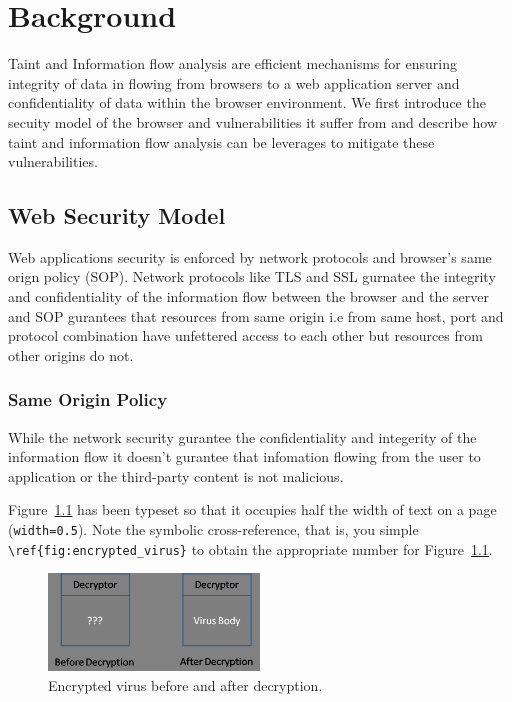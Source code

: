 \chapter{Background\label{chap:blah}}

Taint and Information flow analysis are efficient mechanisms for ensuring integrity of data in flowing from browsers to a web application server and confidentiality of data within the browser environment. We first 
introduce the secuity model of the browser and vulnerabilities it suffer from and describe how taint and information flow analysis can be leverages to mitigate these vulnerabilities.


\section{Web Security Model}

Web applications security is enforced by network protocols and browser's same orign policy (SOP). Network protocols like TLS and SSL gurnatee the integrity and confidentiality of the information flow between the browser and the server and SOP gurantees that resources from same origin i.e from same host, port and protocol combination have unfettered access to each other but resources from other origins do not.

\subsection{Same Origin Policy}
While the network security gurantee the confidentiality and integerity of the information flow it doesn't gurantee that infomation flowing from the user to application or the third-party content is not malicious.
 
Figure~\ref{fig:encrypted_virus} has been typeset so that it
occupies half the width of text on a page ({\tt width=0.5}). Note the 
symbolic cross-reference, that is, you simple \verb+\ref{fig:encrypted_virus}+
to obtain the appropriate number for Figure~\ref{fig:encrypted_virus}.

\begin{figure}[htb]
\centering
\includegraphics[width=0.5\textwidth]{images/encrypted_virus.jpg}
\caption{Encrypted virus before and after decryption.} 
\label{fig:encrypted_virus}
\end{figure}

